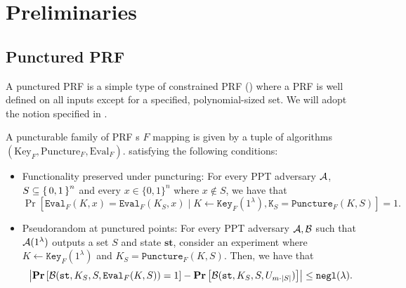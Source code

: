 \newcommand{\MPK}{\text{MPK}}
\newcommand{\MSK}{\text{MSK}}
\newcommand{\SK}{\text{SK}}
\newcommand{\Enc}{\texttt{Enc}}
\newcommand{\Dec}{\texttt{Dec}}
\newcommand{\FEEnc}{\text{FE.Enc}}
\newcommand{\FEDec}{\text{FE.Dec}}
\newcommand{\FESetup}{\text{FE.Setup}}
\newcommand{\FEKeygen}{\text{FE.Keygen}}
\newcommand{\FECT}{\text{CT}}
\newcommand{\adversD}{\mathcal{D}}


\section{Preliminaries}
\subsection{Punctured PRF}
A punctured PRF is a simple type of constrained PRF (\cite{boneh2013constrained,boyle2014functional,kiayias2013delegatable})
where a PRF is well defined on all inputs except for a specified, polynomial-sized set.
We will adopt the notion specified in \cite{sahai2014use}.

\begin{definition}
	A puncturable family of PRF	s $F$ mapping is given by a tuple of algorithms $(\text{Key}_F, \text{Puncture}_F, \text{Eval}_F)$.
	satisfying the following conditions: \begin{itemize}
		\item Functionality preserved under puncturing: For every PPT adversary $\mathcal{A}$,
		$S \subseteq \set{0, 1}^{n}$
		and every $x \in \{0, 1\}^n$ where $x \notin S$, we have that
		\begin{equation*}
			\Pr\left[\texttt{Eval}_F(K, x) = \texttt{Eval}_F(K_S, x) \mid K \gets \texttt{Key}_F(1^\lambda), \texttt{K}_S = \texttt{Puncture}_F(K, S)\right] = 1.
		\end{equation*}
		\item Pseudorandom at punctured points: For every PPT adversary $\mathcal{A}, \mathcal{B}$ such that
		$\mathcal{A}(1^\lambda)$ outputs a set $S$ and state $\mathbf{st}$, consider an experiment where $K \gets \texttt{Key}_F(1^\lambda)$
		and $K_S = \texttt{Puncture}_F(K, S)$. Then, we have that
		\begin{equation*}
			\left|\operatorname*{\mathbf{Pr}}\left[\mathcal{B}(\texttt{st}, K_S, S, \texttt{Eval}_F(K, S)) = 1 \right]
				- \operatorname*{\mathbf{Pr}}\left[\mathcal{B}(\texttt{st}, K_S, S, U_{m \cdot |S|}) \right] \right| \leq \texttt{negl}(\lambda).
		\end{equation*}
	\end{itemize}
\end{definition}

